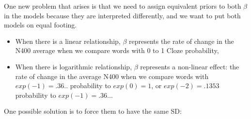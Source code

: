 \documentclass[12pt,ignorenonframetext,aspectratio=169]{beamer}
\newenvironment{Shaded}{\begin{snugshade}}{\end{snugshade}}
\newcommand{\DataTypeTok}[1]{\textcolor[rgb]{0.13,0.29,0.53}{#1}}
\newcommand{\KeywordTok}[1]{\textcolor[rgb]{0.13,0.29,0.53}{\textbf{#1}}}
\newcommand{\NormalTok}[1]{#1}
\newcommand{\OperatorTok}[1]{\textcolor[rgb]{0.81,0.36,0.00}{\textbf{#1}}}
\newcommand{\StringTok}[1]{\textcolor[rgb]{0.31,0.60,0.02}{#1}}
\providecommand{\tightlist}{%
  \setlength{\itemsep}{0pt}\setlength{\parskip}{0pt}}
\begin{document}
\begin{frame}[fragile]

One new problem that arises is that we need to assign equivalent priors to both \(\beta\) in the models because they are interpreted differently, and we want to put both models on equal footing.

\begin{itemize}
\tightlist
\item
  When there is a linear relationship, \(\beta\) represents the rate of change in the N400 average when we compare words with 0 to 1 Cloze probability,
\item
  When there is logarithmic relationship, \(\beta\) represents a non-linear effect: the rate of change in the average N400 when we compare words with \(exp(-1)=.36..\) probability to \(exp(0)=1\), or \(exp(-2) =.1353\) probability to \(exp(-1) = .36...\)
\end{itemize}

One possible solution is to force them to have the same SD:
\footnotesize

\begin{Shaded}
\end{Shaded}

\end{frame}
\end{document}
